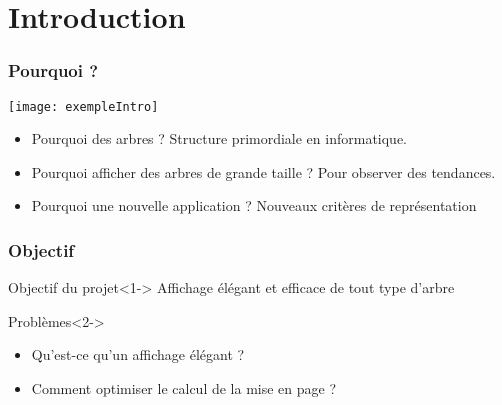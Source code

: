 \section{Introduction}

\begin{frame}
	\frametitle{Pourquoi ?}
	\begin{center}
		\texttt{[image: exempleIntro]} \\
		\begin{itemize}
			\item Pourquoi des arbres ? Structure primordiale en informatique. 
			\item Pourquoi afficher des arbres de grande taille ? Pour observer des tendances. %
			\item Pourquoi une nouvelle application ? Nouveaux critères de représentation
		\end{itemize}
	\end{center}
\end{frame}

\begin{frame}
	\frametitle{Objectif}
	\begin{block}{Objectif du projet}<1->
		Affichage élégant et efficace de tout type d'arbre
	\end{block}
	\begin{alertblock}{Problèmes}<2->
		\begin{itemize}
			\item Qu'est-ce qu'un affichage élégant ?
			\item Comment optimiser le calcul de la mise en page ?
		\end{itemize}
	\end{alertblock}
\end{frame}


